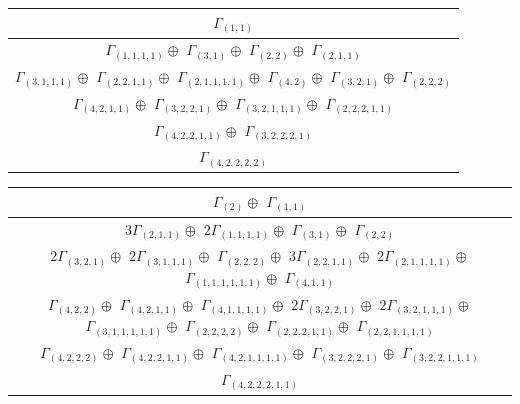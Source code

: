 \documentclass[main.tex]{subfiles}
\begin{document}
\bigskip
\begin{minipage}{1\textwidth}
\centering
\begin{tabular}{c}
$\Gamma_{(
1 , 
1
)}$
\\ \hline
$\Gamma_{(
1 , 
1 , 
1 , 
1
)} \oplus$
$\Gamma_{(
3 , 
1
)} \oplus$
$\Gamma_{(
2 , 
2
)} \oplus$
$\Gamma_{(
2 , 
1 , 
1
)}$
\\ \hline
$\Gamma_{(
3 , 
1 , 
1 , 
1
)} \oplus$
$\Gamma_{(
2 , 
2 , 
1 , 
1
)} \oplus$
$\Gamma_{(
2 , 
1 , 
1 , 
1 , 
1
)} \oplus$
$\Gamma_{(
4 , 
2
)} \oplus$
$\Gamma_{(
3 , 
2 , 
1
)} \oplus$
$\Gamma_{(
2 , 
2 , 
2
)}$
\\ \hline
$\Gamma_{(
4 , 
2 , 
1 , 
1
)} \oplus$
$\Gamma_{(
3 , 
2 , 
2 , 
1
)} \oplus$
$\Gamma_{(
3 , 
2 , 
1 , 
1 , 
1
)} \oplus$
$\Gamma_{(
2 , 
2 , 
2 , 
1 , 
1
)}$
\\ \hline
$\Gamma_{(
4 , 
2 , 
2 , 
1 , 
1
)} \oplus$
$\Gamma_{(
3 , 
2 , 
2 , 
2 , 
1
)}$
\\ \hline
$\Gamma_{(
4 , 
2 , 
2 , 
2 , 
2
)}$
\\
\end{tabular}\end{minipage}
\bigskip
\begin{minipage}{1\textwidth}
\centering
\begin{tabular}{c}
$\Gamma_{(
2
)} \oplus$
$\Gamma_{(
1 , 
1
)}$
\\ \hline
$ 3 \Gamma_{(
2 , 
1 , 
1
)} \oplus$
$ 2 \Gamma_{(
1 , 
1 , 
1 , 
1
)} \oplus$
$\Gamma_{(
3 , 
1
)} \oplus$
$\Gamma_{(
2 , 
2
)}$
\\ \hline
$ 2 \Gamma_{(
3 , 
2 , 
1
)} \oplus$
$ 2 \Gamma_{(
3 , 
1 , 
1 , 
1
)} \oplus$
$\Gamma_{(
2 , 
2 , 
2
)} \oplus$
$ 3 \Gamma_{(
2 , 
2 , 
1 , 
1
)} \oplus$
$ 2 \Gamma_{(
2 , 
1 , 
1 , 
1 , 
1
)} \oplus$
$\Gamma_{(
1 , 
1 , 
1 , 
1 , 
1 , 
1
)} \oplus$
$\Gamma_{(
4 , 
1 , 
1
)}$
\\ \hline
$\Gamma_{(
4 , 
2 , 
2
)} \oplus$
$\Gamma_{(
4 , 
2 , 
1 , 
1
)} \oplus$
$\Gamma_{(
4 , 
1 , 
1 , 
1 , 
1
)} \oplus$
$ 2 \Gamma_{(
3 , 
2 , 
2 , 
1
)} \oplus$
$ 2 \Gamma_{(
3 , 
2 , 
1 , 
1 , 
1
)} \oplus$
$\Gamma_{(
3 , 
1 , 
1 , 
1 , 
1 , 
1
)} \oplus$
$\Gamma_{(
2 , 
2 , 
2 , 
2
)} \oplus$
$\Gamma_{(
2 , 
2 , 
2 , 
1 , 
1
)} \oplus$
$\Gamma_{(
2 , 
2 , 
1 , 
1 , 
1 , 
1
)}$
\\ \hline
$\Gamma_{(
4 , 
2 , 
2 , 
2
)} \oplus$
$\Gamma_{(
4 , 
2 , 
2 , 
1 , 
1
)} \oplus$
$\Gamma_{(
4 , 
2 , 
1 , 
1 , 
1 , 
1
)} \oplus$
$\Gamma_{(
3 , 
2 , 
2 , 
2 , 
1
)} \oplus$
$\Gamma_{(
3 , 
2 , 
2 , 
1 , 
1 , 
1
)}$
\\ \hline
$\Gamma_{(
4 , 
2 , 
2 , 
2 , 
1 , 
1
)}$
\\
\end{tabular}\end{minipage}
\end{document}

